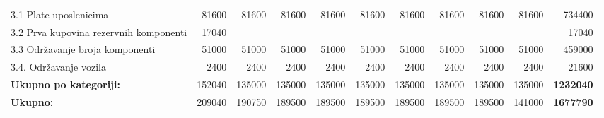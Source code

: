 \documentclass[12pt]{article}
\begin{document}
\begin{landscape}
\begin{table}[htbp]
\begin{tabular}{lrrrrrrrrrr}
    3.1 Plate uposlenicima & 81600 & 81600 & 81600 & 81600 & 81600 & 81600 & 81600 & 81600 & 81600 & 734400 \\
    \multicolumn{1}{p{14.715em}}{3.2 Prva kupovina rezervnih\newline{} komponenti} & 17040 &       &       &       &       &       &       &       &       & 17040 \\
    3.3 Održavanje broja komponenti & 51000 & 51000 & 51000 & 51000 & 51000 & 51000 & 51000 & 51000 & 51000 & 459000 \\
    3.4. Održavanje vozila & 2400  & 2400  & 2400  & 2400  & 2400  & 2400  & 2400  & 2400  & 2400  & 21600 \\
    \midrule
    \textbf{Ukupno po kategoriji:} & 152040 & 135000 & 135000 & 135000 & 135000 & 135000 & 135000 & 135000 & 135000 & \textbf{1232040} \\
    \midrule
    \textbf{Ukupno:} & 209040 & 190750 & 189500 & 189500 & 189500 & 189500 & 189500 & 189500 & 141000 & \textbf{1677790} \\
    \bottomrule
    \end{tabular}%
  \label{tab:addlabel}%
\end{table}%

\end{landscape}
\end{document}
